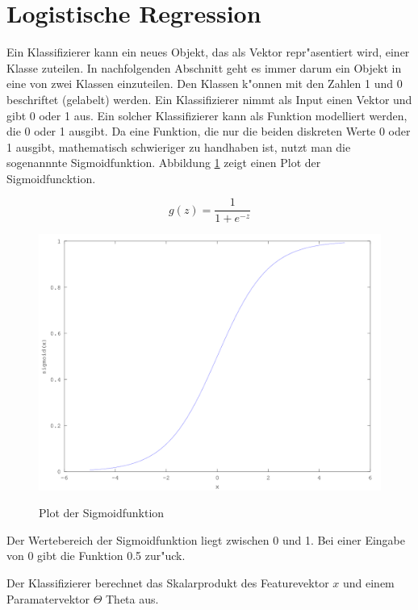 \documentclass[12pt,a4paper,twoside]{article}
\begin{document}

\section{Logistische Regression}
\label{sec:logisticreg}

Ein Klassifizierer kann ein neues Objekt, das als Vektor repr"asentiert wird, einer Klasse zuteilen. In nachfolgenden Abschnitt geht es immer darum ein Objekt in eine von zwei Klassen einzuteilen. Den Klassen k"onnen mit den Zahlen 1 und 0 beschriftet (gelabelt) werden. Ein Klassifizierer nimmt als Input einen Vektor und gibt 0 oder 1 aus. Ein solcher Klassifizierer kann als Funktion modelliert werden, die 0 oder 1 ausgibt. Da eine Funktion, die nur die beiden diskreten Werte 0 oder 1 ausgibt, mathematisch schwieriger zu handhaben ist, nutzt man die sogenannnte Sigmoidfunktion. Abbildung \ref{fig:sigmoidfunc} zeigt einen Plot der Sigmoidfuncktion. 

\[
g(z) = \frac{1}{1 + e^{-z}}
\]


\begin{figure}
  \includegraphics[scale=0.3]{sigmoid}
  \centering
  \label{fig:sigmoidfunc}
  \caption{Plot der Sigmoidfunktion}
\end{figure}

Der Wertebereich der Sigmoidfunktion liegt zwischen 0 und 1. Bei einer Eingabe von 0 gibt die Funktion 0.5 zur"uck.

Der Klassifizierer berechnet das Skalarprodukt des Featurevektor $x$ und einem Paramatervektor $\Theta$ Theta aus.
\end{document}
